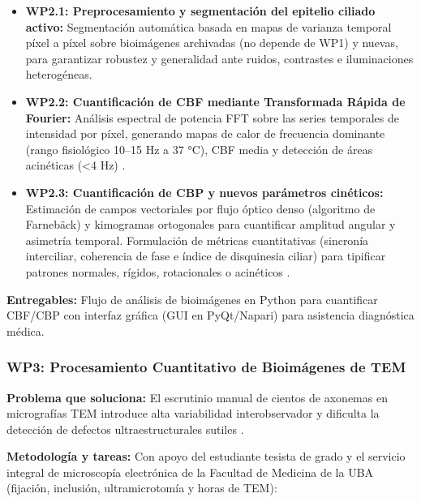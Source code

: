 \documentclass[11pt,letterpaper]{article}
\begin{document}
\begin{itemize}[leftmargin=*,noitemsep,topsep=1pt]
    \item \textbf{WP2.1: Preprocesamiento y segmentación del epitelio ciliado activo:} Segmentación automática basada en mapas de varianza temporal píxel a píxel sobre bioimágenes archivadas (no depende de WP1) y nuevas, para garantizar robustez y generalidad ante ruidos, contrastes e iluminaciones heterogéneas.
    \item \textbf{WP2.2: Cuantificación de CBF mediante Transformada Rápida de Fourier:} Análisis espectral de potencia FFT sobre las series temporales de intensidad por píxel, generando mapas de calor de frecuencia dominante (rango fisiológico 10--15 Hz a 37 °C), CBF media y detección de áreas acinéticas (<4 Hz) \cite{Bricmont2021}.
    \item \textbf{WP2.3: Cuantificación de CBP y nuevos parámetros cinéticos:} Estimación de campos vectoriales por flujo óptico denso (algoritmo de Farnebäck) y kimogramas ortogonales para cuantificar amplitud angular y asimetría temporal. Formulación de métricas cuantitativas (sincronía interciliar, coherencia de fase e índice de disquinesia ciliar) para tipificar patrones normales, rígidos, rotacionales o acinéticos \cite{Bricmont2021,Wrona2025}.
\end{itemize}

\textbf{Entregables:} Flujo de análisis de bioimágenes en Python para cuantificar CBF/CBP con interfaz gráfica (GUI en PyQt/Napari) para asistencia diagnóstica médica.

\subsubsection*{WP3: Procesamiento Cuantitativo de Bioimágenes de TEM}

\textbf{Problema que soluciona:} El escrutinio manual de cientos de axonemas en micrografías TEM introduce alta variabilidad interobservador y dificulta la detección de defectos ultraestructurales sutiles \cite{Bricmont2021,Wrona2025}.

\textbf{Metodología y tareas:} Con apoyo del estudiante tesista de grado y el servicio integral de microscopía electrónica de la Facultad de Medicina de la UBA (fijación, inclusión, ultramicrotomía y horas de TEM):
\end{document}
